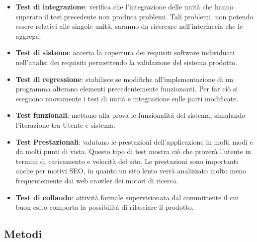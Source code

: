 \begin{itemize}
\begin{itemize}
\item \textbf{Test di integrazione}: verifica che l'integrazione delle unità che hanno superato il test precedente non produca problemi. Tali problemi, non potendo essere relativi alle singole unità, saranno da ricercare nell'interfaccia che le aggrega.

\item \textbf{Test di sistema}: accerta la copertura dei requisiti software individuati nell'analisi dei requisiti permettendo la validazione del sistema prodotto.

\item \textbf{Test di regressione}: stabilisce se modifiche all'implementazione di un programma alterano elementi precedentemente funzionanti. Per far ciò si eseguono nuovamente i test di unità e integrazione sulle parti modificate.

\item \textbf{Test funzionali}: mettono alla prova le funzionalità del sistema, simulando l'iterazione tra Utente e sistema.

\item \textbf{Test Prestazionali}: valutano le prestazioni dell'applicazione in molti modi e da molti punti di vista. Questo tipo di test mostra ciò che proverà l'utente in termini di caricamento e velocità del sito. Le prestazioni sono importanti anche per motivi SEO, in quanto un sito lento verrà analizzato molto meno frequentemente dai web crawler dei motori di ricerca.

\item \textbf{Test di collaudo}: attività formale supervisionata dal committente il cui buon esito comporta la possibilità di rilasciare il prodotto.
\end{itemize}
\end{itemize}
\subsection{Metodi}

